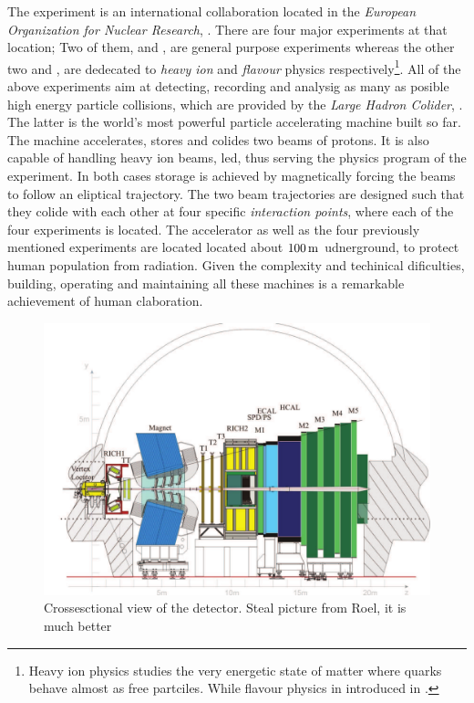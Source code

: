 
The \lhcb experiment is an international collaboration located in the {\it European Organization for Nuclear Research}, \cern.
There are four major experiments at that location; Two of them, \atlas and \cms, are general purpose experiments whereas the other
two \alice and \lhcb, are dedecated to {\it heavy ion} and {\it flavour} physics respectively\footnote{Heavy ion physics studies
the very energetic state of matter where quarks behave almost as free partciles. While flavour physics in introduced in .}.
All of the above experiments aim at detecting, recording and analysig as many as
posible high energy particle collisions, which are provided by the {\it Large Hadron Colider}, \lhc.
The latter is the world's most powerful particle accelerating machine built so far.
The \lhc machine accelerates, stores and colides two beams of protons. It is also capable of handling
heavy ion beams, \eg led, thus serving the physics program of the \alice experiment.
In both cases storage is achieved by magnetically forcing the beams to follow an eliptical trajectory.
The two beam trajectories are designed such that they colide with each other at four specific {\it interaction points},
where each of the four experiments is located. The \lhc accelerator as well as the four previously mentioned
experiments are located located about $100\rm \,m$ udnerground, to protect human population from radiation.
Given the complexity and techinical dificulties, building, operating and maintaining all these machines
is a remarkable achievement of human claboration.

\begin{figure}[t]
  \centering
  \includegraphics[width=\textwidth]{Figures/Chapter2/detector_cross_cmyk}
  \caption{Crossesctional view of the \lhcb detector. {\color{red} Steal picture from Roel, it is much better}}
  \label{lhcb_detector_cross_section}
\end{figure}

